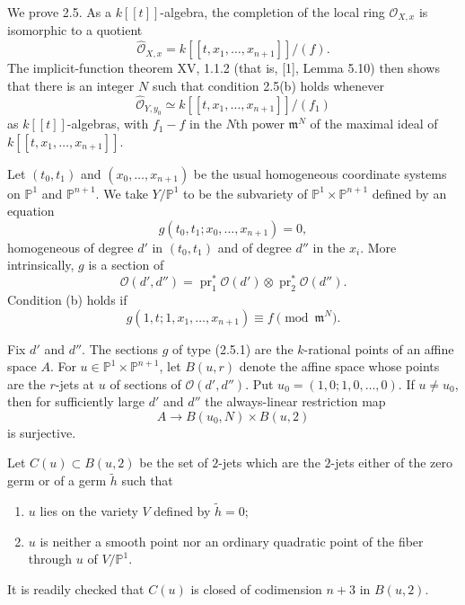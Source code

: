We prove 2.5.  As a $k[[t]]$-algebra, the completion of the local
ring $\mathcal O_{X,x}$ is isomorphic to a quotient
\[
\widehat{\mathcal O}_{X,x}
=k[[t,x_1,\ldots,x_{n+1}]]/(f).
\]
The implicit-function theorem XV, 1.1.2 (that is, [1], Lemma 5.10)
then shows that there is an integer $N$ such that condition 2.5(b)
holds whenever
\[
\widehat{\mathcal O}_{Y,y_0}
\simeq k[[t,x_1,\ldots,x_{n+1}]]/(f_1)
\]
as $k[[t]]$-algebras, with $f_1-f$ in the $N$th power $\mathfrak m^N$
of the maximal ideal of $k[[t,x_1,\ldots,x_{n+1}]]$.

Let $(t_0,t_1)$ and $(x_0,\ldots,x_{n+1})$ be the usual homogeneous
coordinate systems on $\mathbb P^1$ and $\mathbb P^{n+1}$.  We take
$Y/\mathbb P^1$ to be the subvariety of
$\mathbb P^1\times\mathbb P^{n+1}$ defined by an equation
\begin{equation}\tag{2.5.1}
g(t_0,t_1;x_0,\ldots,x_{n+1})=0,
\end{equation}
homogeneous of degree $d'$ in $(t_0,t_1)$ and of degree $d''$ in the
$x_i$.  More intrinsically, $g$ is a section of
\[
\mathcal O(d',d'')=\operatorname{pr}_1^*\mathcal O(d')
\otimes\operatorname{pr}_2^*\mathcal O(d'').
\]
Condition (b) holds if
\begin{equation}\tag{2.5.2}
g(1,t;1,x_1,\ldots,x_{n+1})\equiv f\pmod{\mathfrak m^N}.
\end{equation}

Fix $d'$ and $d''$.  The sections $g$ of type (2.5.1) are the
$k$-rational points of an affine space $A$.  For
$u\in\mathbb P^1\times\mathbb P^{n+1}$, let $B(u,r)$ denote the
affine space whose points are the $r$-jets at $u$ of sections of
$\mathcal O(d',d'')$.  Put
$u_0=(1,0;1,0,\ldots,0)$.  If $u\ne u_0$, then for sufficiently
large $d'$ and $d''$ the always-linear restriction map
\begin{equation}\tag{2.5.3}
A\longrightarrow B(u_0,N)\times B(u,2)
\end{equation}
is surjective.

Let $C(u)\subset B(u,2)$ be the set of $2$-jets which are the
$2$-jets either of the zero germ or of a germ $\widetilde h$ such
that
\begin{enumerate}
\item[(a)] $u$ lies on the variety $V$ defined by $\widetilde h=0$;
\item[(b)] $u$ is neither a smooth point nor an ordinary quadratic
point of the fiber through $u$ of $V/\mathbb P^1$.
\end{enumerate}
It is readily checked that $C(u)$ is closed of codimension $n+3$ in
$B(u,2)$.

